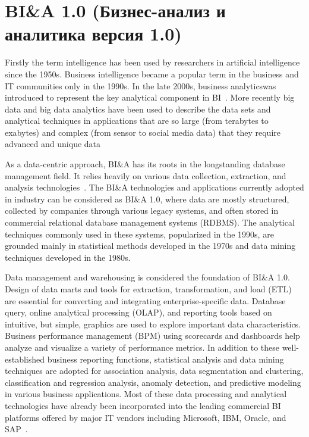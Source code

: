 \section{BI\&A 1.0 (Бизнес-анализ и аналитика версия 1.0)}
Firstly the term intelligence has been used by researchers in
artificial intelligence since the 1950s. Business intelligence
became a popular term in the business and IT communities
only in the 1990s. In the late 2000s, business analyticswas
introduced to represent the key analytical component in BI~\cite{Miller:2012a}. More recently big data and big data
analytics have been used to describe the data sets and analytical techniques in applications that are so large (from
terabytes to exabytes) and complex (from sensor to social
media data) that they require advanced and unique data

As a data-centric approach, BI\&A has its roots in the longstanding database management field. It relies heavily on
various data collection, extraction, and analysis technologies~\cite{Chen:2006}. The BI\&A technologies and applications
currently adopted in industry can be considered as BI\&A 1.0,
where data are mostly structured, collected by companies
through various legacy systems, and often stored in commercial relational database management systems (RDBMS). The
analytical techniques commonly used in these systems,
popularized in the 1990s, are grounded mainly in statistical
methods developed in the 1970s and data mining techniques
developed in the 1980s.

Data management and warehousing is considered the foundation of BI\&A 1.0. Design of data marts and tools for
extraction, transformation, and load (ETL) are essential for
converting and integrating enterprise-specific data. Database
query, online analytical processing (OLAP), and reporting
tools based on intuitive, but simple, graphics are used to
explore important data characteristics. Business performance
management (BPM) using scorecards and dashboards help
analyze and visualize a variety of performance metrics. In
addition to these well-established business reporting functions, statistical analysis and data mining techniques are
adopted for association analysis, data segmentation and
clustering, classification and regression analysis, anomaly
detection, and predictive modeling in various business applications. Most of these data processing and analytical technologies have already been incorporated into the leading commercial BI platforms offered by major IT vendors including
Microsoft, IBM, Oracle, and SAP~\cite{Salton:1989}.

